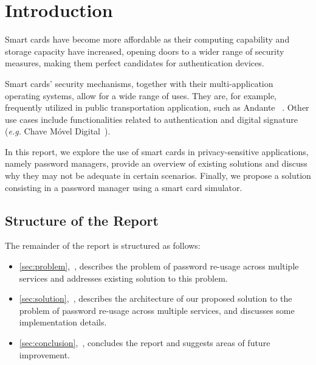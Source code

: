 \documentclass[a4paper, 11pt]{article}
\begin{document}
    \section{Introduction}\label{sec:introduction}

    Smart cards have become more affordable as their computing capability and storage capacity have increased,
    opening doors to a wider range of security measures, making them perfect candidates for authentication
    devices.

    Smart cards' security mechanisms, together with their multi-application operating systems, allow for
    a wide range of uses.
    They are, for example, frequently utilized in public transportation application, such as Andante
    ~\cite{Transpor0:online}.
    Other use cases include functionalities related to authentication and digital signature (\textit{e.g.} Chave Móvel
    Digital~\cite{AChaveMo50:online}).

    In this report, we explore the use of smart cards in privacy-sensitive applications, namely password
    managers, provide an overview of existing solutions and discuss why they may not be adequate in certain scenarios.
    Finally, we propose a solution consisting in a password manager using a smart card simulator.

    \vspace{1.5\baselineskip}

    \subsection*{Structure of the Report}

    The remainder of the report is structured as follows:

    \begin{itemize}
        \item \cref{sec:problem},~\textbf{}, describes the problem of password
        re-usage across multiple services and addresses existing solution to this problem.
        \item \cref{sec:solution},~\textbf{}, describes the architecture of our
        proposed solution to the problem of password re-usage across multiple services, and discusses some implementation
        details.
        \item \cref{sec:conclusion},~\textbf{}, concludes the report and
        suggests areas of future improvement.
    \end{itemize}
\end{document}
